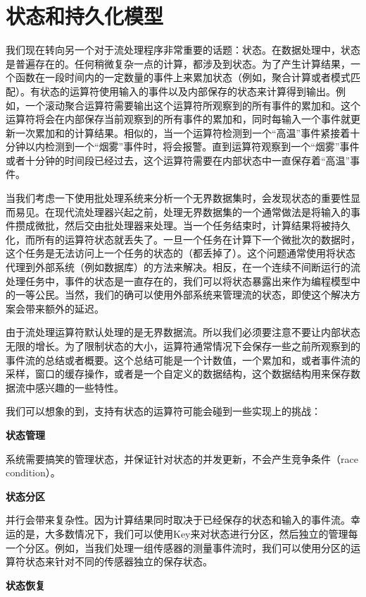 \documentclass[oneside]{ctexbook}
\begin{document}
\section{状态和持久化模型}

我们现在转向另一个对于流处理程序非常重要的话题：状态。在数据处理中，状态是普遍存在的。任何稍微复杂一点的计算，都涉及到状态。为了产生计算结果，一个函数在一段时间内的一定数量的事件上来累加状态（例如，聚合计算或者模式匹配）。有状态的运算符使用输入的事件以及内部保存的状态来计算得到输出。例如，一个滚动聚合运算符需要输出这个运算符所观察到的所有事件的累加和。这个运算符将会在内部保存当前观察到的所有事件的累加和，同时每输入一个事件就更新一次累加和的计算结果。相似的，当一个运算符检测到一个“高温”事件紧接着十分钟以内检测到一个“烟雾”事件时，将会报警。直到运算符观察到一个“烟雾”事件或者十分钟的时间段已经过去，这个运算符需要在内部状态中一直保存着“高温”事件。

当我们考虑一下使用批处理系统来分析一个无界数据集时，会发现状态的重要性显而易见。在现代流处理器兴起之前，处理无界数据集的一个通常做法是将输入的事件攒成微批，然后交由批处理器来处理。当一个任务结束时，计算结果将被持久化，而所有的运算符状态就丢失了。一旦一个任务在计算下一个微批次的数据时，这个任务是无法访问上一个任务的状态的（都丢掉了）。这个问题通常使用将状态代理到外部系统（例如数据库）的方法来解决。相反，在一个连续不间断运行的流处理任务中，事件的状态是一直存在的，我们可以将状态暴露出来作为编程模型中的一等公民。当然，我们的确可以使用外部系统来管理流的状态，即使这个解决方案会带来额外的延迟。

由于流处理运算符默认处理的是无界数据流。所以我们必须要注意不要让内部状态无限的增长。为了限制状态的大小，运算符通常情况下会保存一些之前所观察到的事件流的总结或者概要。这个总结可能是一个计数值，一个累加和，或者事件流的采样，窗口的缓存操作，或者是一个自定义的数据结构，这个数据结构用来保存数据流中感兴趣的一些特性。

我们可以想象的到，支持有状态的运算符可能会碰到一些实现上的挑战：

\textbf{状态管理}

系统需要搞笑的管理状态，并保证针对状态的并发更新，不会产生竞争条件（race condition）。

\textbf{状态分区}

并行会带来复杂性。因为计算结果同时取决于已经保存的状态和输入的事件流。幸运的是，大多数情况下，我们可以使用Key来对状态进行分区，然后独立的管理每一个分区。例如，当我们处理一组传感器的测量事件流时，我们可以使用分区的运算符状态来针对不同的传感器独立的保存状态。

\textbf{状态恢复}
\end{document}
